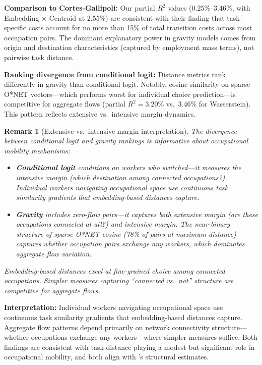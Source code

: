 \documentclass[12pt]{article}
\newtheorem{remark}[definition]{Remark}
\begin{document}
\textbf{Comparison to Cortes-Gallipoli:} Our partial $R^2$ values (0.25\%--3.46\%, with Embedding $\times$ Centroid at 2.55\%) are consistent with their finding that task-specific costs account for no more than 15\% of total transition costs across most occupation pairs. The dominant explanatory power in gravity models comes from origin and destination characteristics (captured by employment mass terms), not pairwise task distance.

\textbf{Ranking divergence from conditional logit:} Distance metrics rank differently in gravity than conditional logit. Notably, cosine similarity on sparse O*NET vectors---which performs worst for individual choice prediction---is competitive for aggregate flows (partial $R^2 = 3.20\%$ vs.\ 3.46\% for Wasserstein). This pattern reflects extensive vs.\ intensive margin dynamics.


\begin{remark}[Extensive vs.\ intensive margin interpretation]
\label{rem:extensive-intensive}
The divergence between conditional logit and gravity rankings is informative about occupational mobility mechanisms:
\begin{itemize}
    \item \textbf{Conditional logit} conditions on workers who switched---it measures the intensive margin (which destination among connected occupations?). Individual workers navigating occupational space use continuous task similarity gradients that embedding-based distances capture.
    \item \textbf{Gravity} includes zero-flow pairs---it captures both extensive margin (are these occupations connected at all?) and intensive margin. The near-binary structure of sparse O*NET cosine (78\% of pairs at maximum distance) captures whether occupation pairs exchange any workers, which dominates aggregate flow variation.
\end{itemize}
Embedding-based distances excel at fine-grained choice among connected occupations. Simpler measures capturing ``connected vs.\ not'' structure are competitive for aggregate flows.
\end{remark}


\textbf{Interpretation:} Individual workers navigating occupational space use continuous task similarity gradients that embedding-based distances capture. Aggregate flow patterns depend primarily on network connectivity structure---whether occupations exchange any workers---where simpler measures suffice. Both findings are consistent with task distance playing a modest but significant role in occupational mobility, and both align with \citet{CortesGallipoli2018}'s structural estimates.
\end{document}
